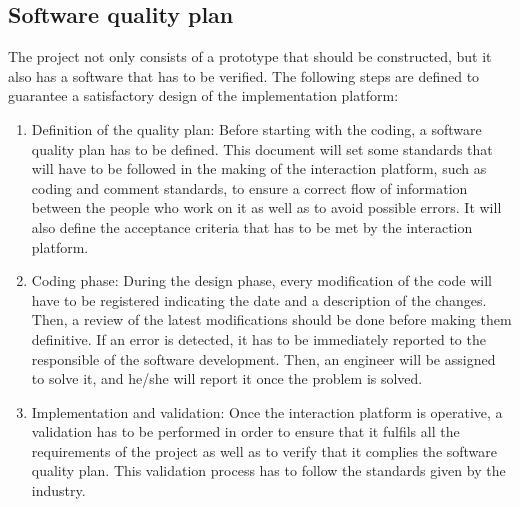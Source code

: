 \subsection{Software quality plan}
The project not only consists of a prototype that should be constructed, but it also has a software that has to be verified. The following steps are defined to guarantee a satisfactory design of the implementation platform:
\begin{enumerate}
	\item Definition of the quality plan: Before starting with the coding, a software quality plan has to be defined. This document will set some standards that will have to be followed in the making of the interaction platform, such as coding and comment standards, to ensure a correct flow of information between the people who work on it as well as to avoid possible errors. It will also define the acceptance criteria that has to be met by the interaction platform.
	\item Coding phase: During the design phase, every modification of the code will have to be registered indicating the date and a description of the changes. Then, a review of the latest modifications should be done before making them definitive.	If an error is detected, it has to be immediately reported to the responsible of the software development. Then, an engineer will be assigned to solve it, and he/she will report it once the problem is solved.
	\item Implementation and validation: Once the interaction platform is operative, a validation has to be performed in order to ensure that it fulfils all the requirements of the project as well as to verify that it complies the software quality plan. This validation process has to follow the standards given by the industry.
\end{enumerate}